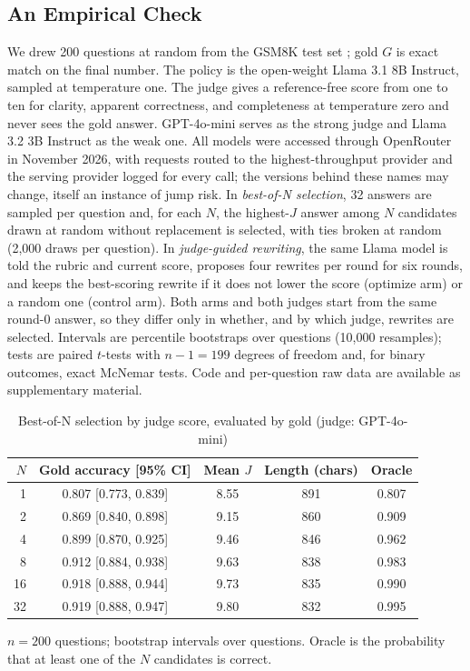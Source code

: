 \documentclass[acmsmall,screen,review]{acmart}
\theoremstyle{acmdefinition}
\begin{document}
\subsection{An Empirical Check}

We drew 200 questions at random from the GSM8K test set \citep{cobbe2021}; gold $G$ is exact match on the final number. The policy is the open-weight Llama 3.1 8B Instruct, sampled at temperature one. The judge gives a reference-free score from one to ten for clarity, apparent correctness, and completeness at temperature zero and never sees the gold answer. GPT-4o-mini serves as the strong judge and Llama 3.2 3B Instruct as the weak one. All models were accessed through OpenRouter in November 2026, with requests routed to the highest-throughput provider and the serving provider logged for every call; the versions behind these names may change, itself an instance of jump risk. In \emph{best-of-N selection}, 32 answers are sampled per question and, for each $N$, the highest-$J$ answer among $N$ candidates drawn at random without replacement is selected, with ties broken at random (2,000 draws per question). In \emph{judge-guided rewriting}, the same Llama model is told the rubric and current score, proposes four rewrites per round for six rounds, and keeps the best-scoring rewrite if it does not lower the score (optimize arm) or a random one (control arm). Both arms and both judges start from the same round-0 answer, so they differ only in whether, and by which judge, rewrites are selected. Intervals are percentile bootstraps over questions (10,000 resamples); tests are paired $t$-tests with $n - 1 = 199$ degrees of freedom and, for binary outcomes, exact McNemar tests. Code and per-question raw data are available as supplementary material.

\begin{table}[t]
\caption{Best-of-N selection by judge score, evaluated by gold (judge: GPT-4o-mini)}\label{tab:bon}
\small
\begin{tabular}{@{}rcccc@{}}
\toprule
$N$ & Gold accuracy [95\% CI] & Mean $J$ & Length (chars) & Oracle \\
\midrule
1 & 0.807 [0.773, 0.839] & 8.55 & 891 & 0.807 \\
2 & 0.869 [0.840, 0.898] & 9.15 & 860 & 0.909 \\
4 & 0.899 [0.870, 0.925] & 9.46 & 846 & 0.962 \\
8 & 0.912 [0.884, 0.938] & 9.63 & 838 & 0.983 \\
16 & 0.918 [0.888, 0.944] & 9.73 & 835 & 0.990 \\
32 & 0.919 [0.888, 0.947] & 9.80 & 832 & 0.995 \\
\bottomrule
\end{tabular}
\par\smallskip\footnotesize $n = 200$ questions; bootstrap intervals over questions. Oracle is the probability that at least one of the $N$ candidates is correct.
\end{table}
\end{document}
